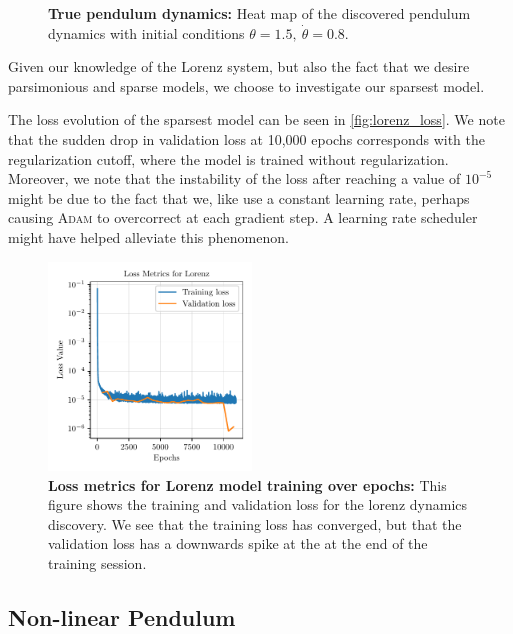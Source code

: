 \begin{figure}[t]
\begin{minipage}[b]{.45\textwidth}
    \caption{\textbf{True pendulum dynamics:} Heat map of the discovered pendulum dynamics with initial conditions $\theta=1.5,\ \dot{\theta}=0.8$.}
    \label{fig:discovered_heatmap_pendulum}
\end{minipage}
\end{figure}
Given our knowledge of the Lorenz system, but also the fact that we desire parsimonious and sparse models, we choose to investigate our sparsest model. 

The loss evolution of the sparsest model can be seen in \autoref{fig:lorenz_loss}.
We note that the sudden drop  in validation loss at 10,000 epochs corresponds with the regularization cutoff, where the model is trained without regularization. 
Moreover, we note that the instability of the loss after reaching a value of $10^{-5}$ might be due to the fact that we, like \textcite{Champion_2019} use a constant learning rate, perhaps causing \textsc{Adam} to overcorrect at each gradient step. 
A learning rate scheduler might have helped alleviate this phenomenon. 

\begin{figure}
    \centering
    \includegraphics[width=0.48\textwidth]{project_2/images/Loss Metrics for Lorenz.pdf}
    \vspace{-8mm}
    \caption{\textbf{Loss metrics for Lorenz model training over epochs:} This figure shows the training and validation loss for the lorenz dynamics discovery. We see that the training loss has converged, but that the validation loss has a downwards spike at the at the end of the training session.}
    \label{fig:lorenz_loss}
\end{figure}





\subsection{Non-linear Pendulum}
